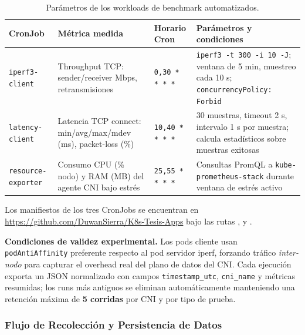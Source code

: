 \begin{table}[htbp]
\centering
\scriptsize
\caption{Parámetros de los workloads de benchmark automatizados.}
\label{tab:apa_benchmark}
\begin{tabularx}{\textwidth}{|l|Y|l|Y|}
\hline
\textbf{CronJob} & \textbf{Métrica medida}
  & \textbf{Horario Cron} & \textbf{Parámetros y condiciones} \\
\hline
\texttt{iperf3-client}
  & Throughput TCP: sender/receiver Mbps, retransmisiones
  & \texttt{0,30\,*\,*\,*\,*}
  & \texttt{iperf3 -t 300 -i 10 -J}; ventana de 5 min,
    muestreo cada 10 s; \texttt{concurrencyPolicy: Forbid} \\
\hline
\texttt{latency-client}
  & Latencia TCP connect: min/avg/max/mdev (ms), packet-loss (\%)
  & \texttt{10,40\,*\,*\,*\,*}
  & 30 muestras, timeout 2 s, intervalo 1 s por muestra;
    calcula estadísticos sobre muestras exitosas \\
\hline
\texttt{resource-exporter}
  & Consumo CPU (\% nodo) y RAM (MB) del agente CNI bajo estrés
  & \texttt{25,55\,*\,*\,*\,*}
  & Consultas PromQL a \texttt{kube-prometheus-stack}
    durante ventana de estrés activo \\
\hline
\end{tabularx}
\end{table}

\noindent Los manifiestos de los tres CronJobs se encuentran en
\url{https://github.com/DuwanSierra/K8s-Tesis-Apps} bajo las rutas
,
 y
.

\medskip\noindent\textbf{Condiciones de validez experimental.}
Los pods cliente usan \texttt{podAntiAffinity} preferente respecto
al pod servidor iperf, forzando tráfico \emph{inter-nodo} para
capturar el overhead real del plano de datos del CNI. Cada ejecución
exporta un JSON normalizado con campos \texttt{timestamp\_utc},
\texttt{cni\_name} y métricas resumidas; los runs más antiguos se
eliminan automáticamente manteniendo una retención máxima de
\textbf{5 corridas} por CNI y por tipo de prueba.

\subsubsection{Flujo de Recolección y Persistencia de Datos}

